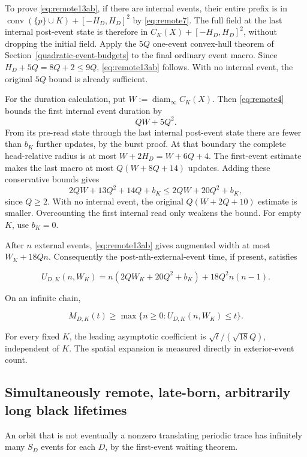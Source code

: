 \documentclass[
  11pt,
]{article}
\begin{document}
To prove \eqref{eq:remote13ab}, if there are internal events, their entire prefix
is in $\operatorname{conv}(\{p\}\cup K)+[-H_D,H_D]^2$ by \eqref{eq:remote7}. The full
field at the last internal post-event state is therefore in
$C_K(X)+[-H_D,H_D]^2$, without dropping the initial field. Apply
the \(5Q\) one-event convex-hull theorem of Section~\ref{quadratic-event-budgets} to the final ordinary
event macro. Since $H_D+5Q=8Q+2\le9Q$, \eqref{eq:remote13ab} follows. With
no internal event, the original \(5Q\) bound is already sufficient.

For the duration calculation, put \(W:=\operatorname{diam}_\infty C_K(X)\).
Then \eqref{eq:remote4} bounds the first internal event duration by
\[QW+5Q^2.\]
From its pre-read state through the last internal post-event state there are
fewer than \(b_K\) further updates, by the burst proof. At that boundary the
complete head-relative radius is at most \(W+2H_D=W+6Q+4\).
The first-event estimate makes the last macro at most \(Q(W+8Q+14)\)
updates. Adding these conservative bounds gives
\[
2QW+13Q^2+14Q+b_K\le2QW+20Q^2+b_K,
\]
since \(Q\ge2\). With no internal event, the original
\(Q(W+2Q+10)\) estimate is smaller. Overcounting the first internal read
only weakens the bound. For empty \(K\), use \(b_K=0\).

After \(n\) external events, \eqref{eq:remote13ab} gives augmented width at most
$W_K+18Qn$. Consequently the post-nth-external-event time, if present,
satisfies

\begin{equation}\label{eq:remote13c}
U_{D,K}(n,W_K)=n(2QW_K+20Q^2+b_K)+18Q^2n(n-1).
\end{equation}

On an infinite chain,

\begin{equation}\label{eq:remote13d}
M_{D,K}(t)\ge\max\{n\ge0:U_{D,K}(n,W_K)\le t\}.
\end{equation}

For every fixed \(K\), the leading asymptotic coefficient is
\(\sqrt{t}/(\sqrt{18}Q)\), independent of \(K\). The spatial expansion
is measured directly in exterior-event count.

\subsection{Simultaneously remote, late-born, arbitrarily long black
lifetimes}\label{remote-7}

An orbit that is not eventually a nonzero translating periodic trace has
infinitely many $S_D$ events for each $D$, by the first-event waiting theorem.
\end{document}
